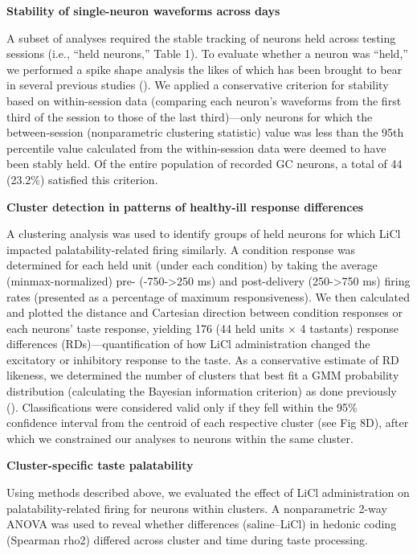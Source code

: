 \begin{refsection}
{\smallskip
\noindent\textbf{Stability of single-neuron waveforms across days}\par
\noindent 
A subset of analyses required the stable tracking of neurons held across testing sessions (i.e., “held neurons,” Table 1). To evaluate whether a neuron was “held,” we performed a spike shape analysis the likes of which has been brought to bear in several previous studies (\cite{grossman2008a,moran2014a,nicolelis2003a,herry2008a}). We applied a conservative criterion for stability based on within-session data (comparing each neuron’s waveforms from the first third of the session to those of the last third)—only neurons for which the between-session (nonparametric clustering statistic) value was less than the 95th percentile value calculated from the within-session data were deemed to have been stably held. Of the entire population of recorded GC neurons, a total of 44 (23.2\%) satisfied this criterion.

\smallskip
\noindent\textbf{Cluster detection in patterns of healthy-ill response differences}\par
\noindent 
A clustering analysis was used to identify groups of held neurons for which LiCl impacted palatability-related firing similarly. A condition response was determined for each held unit (under each condition) by taking the average (minmax-normalized) pre- (-750->250 ms) and post-delivery (250->750 ms) firing rates (presented as a percentage of maximum responsiveness). We then calculated and plotted the distance and Cartesian direction between condition responses or each neurons’ taste response, yielding 176 (44 held units × 4 tastants) response differences (RDs)—quantification of how LiCl administration changed the excitatory or inhibitory response to the taste. As a conservative estimate of RD likeness, we determined the number of clusters that best fit a GMM probability distribution (calculating the Bayesian information criterion) as done previously (\cite{athey2019a}). Classifications were considered valid only if they fell within the 95\% confidence interval from the centroid of each respective cluster (see Fig 8D), after which we constrained our analyses to neurons within the same cluster.

\smallskip
\noindent\textbf{Cluster-specific taste palatability}\par
\noindent 
Using methods described above, we evaluated the effect of LiCl administration on palatability-related firing for neurons within clusters. A nonparametric 2-way ANOVA was used to reveal whether differences (saline–LiCl) in hedonic coding (Spearman rho2) differed across cluster and time during taste processing.

}
\end{refsection}
